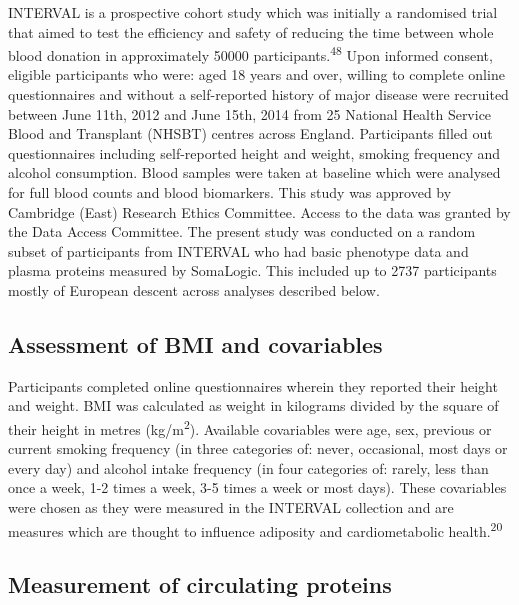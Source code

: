 \documentclass[11pt,twoside]{bristolthesis}
\begin{document}
INTERVAL is a prospective cohort study which was initially a randomised trial that aimed to test the efficiency and safety of reducing the time between whole blood donation in approximately 50000 participants.\textsuperscript{48} Upon informed consent, eligible participants who were: aged 18 years and over, willing to complete online questionnaires and without a self-reported history of major disease were recruited between June 11th, 2012 and June 15th, 2014 from 25 National Health Service Blood and Transplant (NHSBT) centres across England. Participants filled out questionnaires including self-reported height and weight, smoking frequency and alcohol consumption. Blood samples were taken at baseline which were analysed for full blood counts and blood biomarkers. This study was approved by Cambridge (East) Research Ethics Committee. Access to the data was granted by the Data Access Committee.
The present study was conducted on a random subset of participants from INTERVAL who had basic phenotype data and plasma proteins measured by SomaLogic. This included up to 2737 participants mostly of European descent across analyses described below.

\hypertarget{assessment-of-bmi-and-covariables}{%
\subsection{Assessment of BMI and covariables}\label{assessment-of-bmi-and-covariables}}

Participants completed online questionnaires wherein they reported their height and weight. BMI was calculated as weight in kilograms divided by the square of their height in metres (kg/m\textsuperscript{2}). Available covariables were age, sex, previous or current smoking frequency (in three categories of: never, occasional, most days or every day) and alcohol intake frequency (in four categories of: rarely, less than once a week, 1-2 times a week, 3-5 times a week or most days). These covariables were chosen as they were measured in the INTERVAL collection and are measures which are thought to influence adiposity and cardiometabolic health.\textsuperscript{20}

\hypertarget{measurement-of-circulating-proteins}{%
\subsection{Measurement of circulating proteins}\label{measurement-of-circulating-proteins}}
\end{document}
